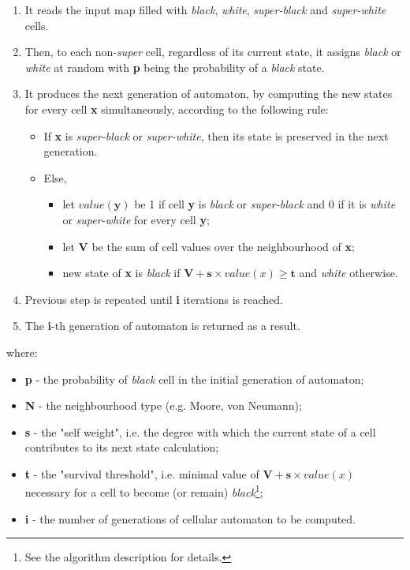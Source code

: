 \documentclass[a4paper, 11pt]{article} %
\begin{document}
\begin{enumerate}
	\item It reads the input map filled with \emph{black}, \emph{white}, \emph{super-black} and \emph{super-white} cells.
	\item Then, to each non-\emph{super} cell, regardless of its current state, it assigns \emph{black} or \emph{white} at random with \textbf{p} being the probability of a \emph{black} state.
	\item It produces the next generation of automaton, by computing the new states for every cell \textbf{x} simultaneously, according to the following rule:
		\begin{itemize}
			\item If \textbf{x} is \emph{super-black} or \emph{super-white}, then its state is preserved in the next generation.
			\item Else,
				\begin{itemize}
					\item let $value(\textbf{y})$ be 1 if cell \textbf{y} is \emph{black} or \emph{super-black} and 0 if it is \emph{white} or \emph{super-white} for every cell \textbf{y};
					\item let \textbf{V} be the sum of cell values over the neighbourhood of \textbf{x};
					\item new state of \textbf{x} is \emph{black} if $\textbf{V} + \textbf{s} \times value(x) \geq \textbf{t}$ and \emph{white} otherwise.
				\end{itemize}
		\end{itemize}
	\item Previous step is repeated until \textbf{i} iterations is reached.
	\item The \textbf{i}-th generation of automaton is returned as a result.
\end{enumerate}
where:

\begin{itemize}
	\item \textbf{p} - the probability of \emph{black} cell in the initial generation of automaton;
	\item \textbf{N} - the neighbourhood type (e.g. Moore, von Neumann);
	\item \textbf{s} - the "self weight", i.e. the degree with which the current state of a cell contributes to its next state calculation;
	\item \textbf{t} - the "survival threshold", i.e. minimal value of $\textbf{V} + \textbf{s} \times value(x)$  necessary for a cell to become (or remain) \emph{black}\footnote{See the algorithm description for details.};
	\item \textbf{i} - the number of generations of cellular automaton to be computed.
\end{itemize}
\end{document}
